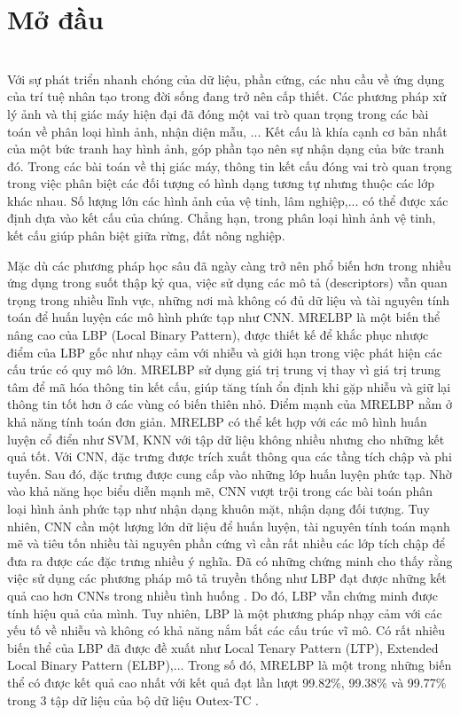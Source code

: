 \clearpage
{}

\chapter*{Mở đầu}
\vspace{0.3cm}
\\ Với sự phát triển nhanh chóng của dữ liệu, phần cứng, các nhu cầu về ứng dụng của trí tuệ nhân tạo trong đời sống đang trở nên cấp thiết. Các phương pháp xử lý ảnh và thị giác máy hiện đại đã đóng một vai trò quan trọng trong các bài toán về phân loại hình ảnh, nhận diện mẫu, ... Kết cấu là khía cạnh cơ bản nhất của một bức tranh hay hình ảnh, góp phần tạo nên sự nhận dạng của bức tranh đó. Trong các bài toán về thị giác máy, thông tin kết cấu đóng vai trò quan trọng trong việc phân biệt các đối tượng có hình dạng tương tự nhưng thuộc các lớp khác nhau. Số lượng lớn các hình ảnh của vệ tinh, lâm nghiệp,... có thể được xác định  dựa vào kết cấu của chúng. Chẳng hạn, trong phân loại hình ảnh vệ tinh, kết cấu giúp phân biệt giữa rừng, đất nông nghiệp. 


Mặc dù các phương pháp học sâu đã ngày càng trở nên phổ biến hơn trong nhiều ứng dụng trong suốt thập kỷ qua, việc sử dụng các mô tả (descriptors) vẫn quan trọng trong nhiều lĩnh vực, những nơi mà không có đủ dữ liệu và tài nguyên tính toán để huấn luyện các mô hình phức tạp như CNN. MRELBP là một biến thể nâng cao của LBP (Local Binary Pattern), được thiết kế để khắc phục nhược điểm của LBP gốc như nhạy cảm với nhiễu và giới hạn trong việc phát hiện các cấu trúc có quy mô lớn. MRELBP sử dụng giá trị trung vị thay vì giá trị trung tâm để mã hóa thông tin kết cấu, giúp tăng tính ổn định khi gặp nhiễu và giữ lại thông tin tốt hơn ở các vùng có biến thiên nhỏ. Điểm mạnh của MRELBP nằm ở khả năng tính toán đơn giản. MRELBP có thể kết hợp với các mô hình huấn luyện cổ điển như SVM, KNN với tập dữ liệu không nhiều nhưng cho những kết quả tốt. Với CNN, đặc trưng được trích xuất thông qua các tầng tích chập và phi tuyến. Sau đó, đặc trưng được cung cấp vào những lớp huấn luyện phức tạp. Nhờ vào khả năng học biểu diễn mạnh mẽ, CNN vượt trội trong các bài toán phân loại hình ảnh phức tạp như nhận dạng khuôn mặt, nhận dạng đối tượng. Tuy nhiên, CNN cần một lượng lớn dữ liệu để huấn luyện, tài nguyên tính toán mạnh mẽ và tiêu tốn nhiều tài nguyên phần cứng vì cần rất nhiều các lớp tích chập để đưa ra được các đặc trưng nhiều ý nghĩa. Đã có những chứng minh cho thấy rằng việc sử dụng các phương pháp mô tả truyền thống như LBP đạt được những kết quả cao hơn CNNs trong nhiều tình huống \cite{Liu2017}. Do đó, LBP vẫn chứng minh được tính hiệu quả của mình. Tuy nhiên, LBP là một phương pháp nhạy cảm với các yếu tố về nhiễu và không có khả năng nắm bắt các cấu trúc vĩ mô. Có rất nhiều biến thể của LBP đã được đề xuất như Local Tenary Pattern (LTP), Extended Local Binary Pattern (ELBP),... Trong số đó, MRELBP là một trong những biến thể có được kết quả cao nhất với kết quả đạt lần lượt 99.82\%, 99.38\% và 99.77\% trong 3 tập dữ liệu của bộ dữ liệu Outex-TC \cite{Liu2016}.   


